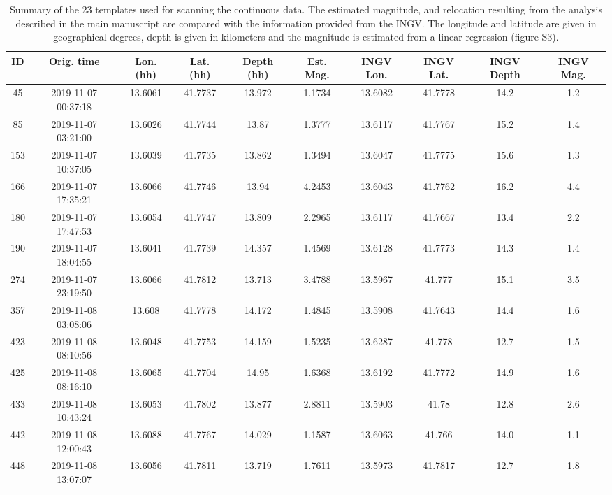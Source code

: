 \documentclass[a4paper,12pt]{article}
\begin{document}
\begin{landscape}

\begin{table}
\renewcommand{\thetable}{S\arabic{table}}
 \caption{Summary of the 23 templates used for scanning the continuous data. The estimated magnitude, and relocation resulting from the analysis described in the main manuscript are compared with the information provided from the INGV. The longitude and latitude are given in geographical degrees, depth is given in kilometers and the magnitude is estimated from a linear regression (figure S3).}
 \begin{center}
 \begin{tabular}{@{} c c c c c c c c c c}
\hline
ID & Orig. time & Lon. (hh) & Lat. (hh) & Depth (hh) & Est. Mag. & INGV Lon. & INGV Lat. & INGV Depth & INGV Mag. \\
\hline 
45 & 2019-11-07 00:37:18 & 13.6061 & 41.7737 & 13.972 & 1.1734 & 13.6082 & 41.7778 & 14.2 & 1.2 \\
85 & 2019-11-07 03:21:00 & 13.6026 & 41.7744 & 13.87 & 1.3777 & 13.6117 & 41.7767 & 15.2 & 1.4 \\
153 & 2019-11-07 10:37:05 & 13.6039 & 41.7735 & 13.862 & 1.3494 & 13.6047 & 41.7775 & 15.6 & 1.3 \\
166 & 2019-11-07 17:35:21 & 13.6066 & 41.7746 & 13.94 & 4.2453 & 13.6043 & 41.7762 & 16.2 & 4.4 \\
180 & 2019-11-07 17:47:53 & 13.6054 & 41.7747 & 13.809 & 2.2965 & 13.6117 & 41.7667 & 13.4 & 2.2 \\
190 & 2019-11-07 18:04:55 & 13.6041 & 41.7739 & 14.357 & 1.4569 & 13.6128 & 41.7773 & 14.3 & 1.4 \\
274 & 2019-11-07 23:19:50 & 13.6066 & 41.7812 & 13.713 & 3.4788 & 13.5967 & 41.777 & 15.1 & 3.5 \\
357 & 2019-11-08 03:08:06 & 13.608 & 41.7778 & 14.172 & 1.4845 & 13.5908 & 41.7643 & 14.4 & 1.6 \\
423 & 2019-11-08 08:10:56 & 13.6048 & 41.7753 & 14.159 & 1.5235 & 13.6287 & 41.778 & 12.7 & 1.5 \\
425 & 2019-11-08 08:16:10 & 13.6065 & 41.7704 & 14.95 & 1.6368 & 13.6192 & 41.7772 & 14.9 & 1.6 \\
433 & 2019-11-08 10:43:24 & 13.6053 & 41.7802 & 13.877 & 2.8811 & 13.5903 & 41.78 & 12.8 & 2.6 \\
442 & 2019-11-08 12:00:43 & 13.6088 & 41.7767 & 14.029 & 1.1587 & 13.6063 & 41.766 & 14.0 & 1.1 \\
448 & 2019-11-08 13:07:07 & 13.6056 & 41.7811 & 13.719 & 1.7611 & 13.5973 & 41.7817 & 12.7 & 1.8 \\

\end{tabular}
\end{center}
\end{table}
\end{landscape}
\end{document}
